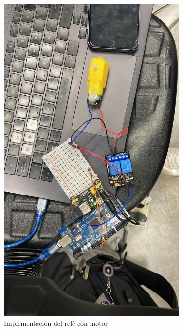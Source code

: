 \documentclass{article}
\begin{document}
\begin{figure}[H]
    \centering
    \includegraphics[width=0.85\textwidth]{./img/checkpoint_presencialrele.jpeg}
    \caption{Implementación del relé con motor}
    \label{fig:motor_driver}
\end{figure}
\end{document}
